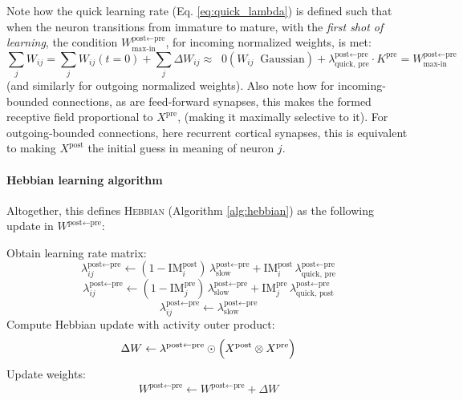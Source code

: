 \documentclass{article}
\begin{document}
Note how the quick learning rate (Eq. \eqref{eq:quick_lambda}) is defined such that when the neuron transitions from immature to mature, with the  \textit{first shot of learning}, the condition $W^{\textrm{post}\leftarrow\textrm{pre}}_\textrm{max-in}$, for incoming normalized weights, is met:
\begin{equation}
    \sum_j W_{ij} = \sum_j W_{ij}(t = 0) + \sum_j \Delta W_{ij} \approx \;\; 0 (W_{ij} \;\; \textrm{Gaussian})  +\lambda^{\textrm{post}\leftarrow\textrm{pre}}_\textrm{quick, pre}\cdot K^\textrm{pre} = W^{\textrm{post}\leftarrow\textrm{pre}}_\textrm{max-in}
\end{equation}
(and similarly for outgoing normalized weights). Also note how for incoming-bounded connections, as are feed-forward synapses, this makes the formed receptive field proportional to $X^\textrm{pre}$, (making it maximally selective to it). For outgoing-bounded connections, here recurrent cortical synapses, this is equivalent to making $X^\textrm{post}$ the initial guess in meaning of neuron $j$.
\paragraph*{Hebbian learning algorithm}
Altogether, this defines \textsc{Hebbian} (Algorithm \ref{alg:hebbian}) as the following update in $W^{\textrm{post} \leftarrow \textrm{pre}}$:
\begin{algorithm}
\caption{Hebbian Learning}\label{alg:hebbian}
\begin{algorithmic}[1]
    \State Obtain learning rate matrix:
        \State \Return
    \EndIf
        \[
            \lambda_{ij}^{\textrm{post} \leftarrow \textrm{pre}}
            \gets
            (1-\textrm{IM}^\textrm{post}_i)\,\lambda^{\textrm{post} \leftarrow \textrm{pre}}_\textrm{slow}
            + \textrm{IM}^\textrm{post}_i\,\lambda^{\textrm{post}\leftarrow\textrm{pre}}_{\textrm{quick, pre}}
        \]
        \[
            \lambda_{ij}^{\textrm{post} \leftarrow \textrm{pre}}
            \gets
            (1-\textrm{IM}^\textrm{pre}_j)\,\lambda^{\textrm{post} \leftarrow \textrm{pre}}_\textrm{slow}
            + \textrm{IM}^\textrm{pre}_j\,\lambda^{\textrm{post}\leftarrow\textrm{pre}}_{\textrm{quick, post}}
        \]
    \Else
        \[
            \lambda_{ij}^{\textrm{post} \leftarrow \textrm{pre}} 
            \gets 
            \lambda^{\textrm{post}\leftarrow\textrm{pre}}_\textrm{slow}
        \]
    \EndIf
    \State Compute Hebbian update with activity outer product:
        \[
            \Delta W \gets \lambda^{\textrm{post} \leftarrow \textrm{pre}} \odot 
            \Bigl(X^{\textrm{post}} \otimes X^{\textrm{pre}}\Bigr)
        \]
    \State Update weights:
        \[
            W^{\textrm{post} \leftarrow \textrm{pre}} 
            \gets 
            W^{\textrm{post} \leftarrow \textrm{pre}} + \Delta W
        \]
\EndFunction
\end{algorithmic}
\end{algorithm}
\end{document}
